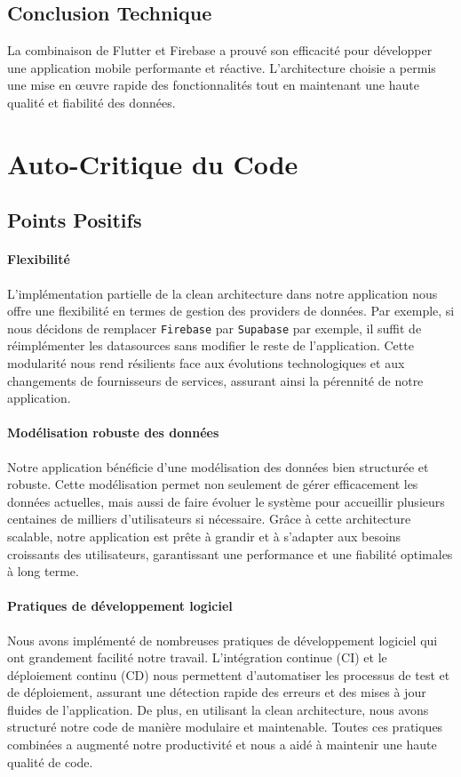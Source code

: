 \subsection{Conclusion Technique}

La combinaison de Flutter et Firebase a prouvé son efficacité pour développer une application mobile performante et réactive. L'architecture choisie a permis une mise en œuvre rapide des fonctionnalités tout en maintenant une haute qualité et fiabilité des données.

\section{Auto-Critique du Code}

\subsection{Points Positifs}

\paragraph{Flexibilité}
L'implémentation partielle de la clean architecture dans notre application nous offre une flexibilité en termes de gestion des providers de données. Par exemple, si nous décidons de remplacer \texttt{Firebase} par \texttt{Supabase} par exemple, il suffit de réimplémenter les datasources sans modifier le reste de l'application. Cette modularité nous rend résilients face aux évolutions technologiques et aux changements de fournisseurs de services, assurant ainsi la pérennité de notre application.

\paragraph{Modélisation robuste des données}
Notre application bénéficie d'une modélisation des données bien structurée et robuste. Cette modélisation permet non seulement de gérer efficacement les données actuelles, mais aussi de faire évoluer le système pour accueillir plusieurs centaines de milliers d'utilisateurs si nécessaire. Grâce à cette architecture scalable, notre application est prête à grandir et à s'adapter aux besoins croissants des utilisateurs, garantissant une performance et une fiabilité optimales à long terme.

\paragraph{Pratiques de développement logiciel}
Nous avons implémenté de nombreuses pratiques de développement logiciel qui ont grandement facilité notre travail. L'intégration continue (CI) et le déploiement continu (CD) nous permettent d'automatiser les processus de test et de déploiement, assurant une détection rapide des erreurs et des mises à jour fluides de l'application. De plus, en utilisant la clean architecture, nous avons structuré notre code de manière modulaire et maintenable. Toutes ces pratiques combinées a augmenté notre productivité et nous a aidé à maintenir une haute qualité de code.


